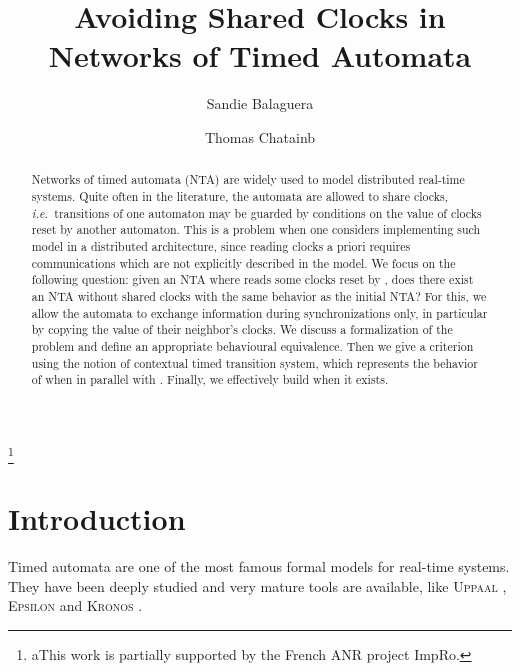 \documentclass{LMCS}
\theoremstyle{plain}\newtheorem*{prop11}{Proposition~\ref{prop:states} bis}
\def\ie{{\em i.e.\ }}
\begin{document}
\title[Avoiding Shared Clocks in NTA]
{Avoiding Shared Clocks in Networks of Timed Automata\rsuper*}

\author[S.~Balaguer]{Sandie Balaguer\rsuper a}	\address{LSV (ENS Cachan, CNRS, Inria)\\
61, avenue du Pr\'esident Wilson\\
94235 CACHAN Cedex, France}	  \thanks{{\lsuper a}This work is partially supported by the French ANR project ImpRo.}

\author[T.~Chatain]{Thomas Chatain\rsuper b}	







\begin{abstract}
  \noindent Networks of timed automata (NTA) are widely used to model distributed real-time
  systems. Quite often in the literature, the automata are allowed to share
  clocks, \ie transitions of one automaton may be guarded by conditions
  on the value of clocks reset by another automaton. This is a
  problem when one considers implementing such model in a distributed
  architecture, since reading clocks a priori requires communications which are
  not explicitly described in the model. We focus on the following question: given
  an NTA  where  reads some clocks reset by ,
  does there exist an NTA  without shared clocks
  with the same behavior as the initial NTA?
For this, we allow the automata to exchange information during synchronizations
  only, in particular by copying the value of their neighbor's clocks.
We discuss a formalization of the problem and define an appropriate
  behavioural equivalence. Then we give a criterion using the notion
  of contextual timed transition system, which represents the behavior of 
  when in parallel with .
  Finally, we effectively build  when it exists.
\end{abstract}

\maketitle

\section*{Introduction}
Timed automata \cite{AD94} are one of the most famous formal models for
real-time systems. They have been deeply studied and very mature tools are
available, like \textsc{Uppaal} \cite{uppaal}, \textsc{Epsilon}
\cite{Epsilon93} and \textsc{Kronos} \cite{kronos}.
\end{document}
